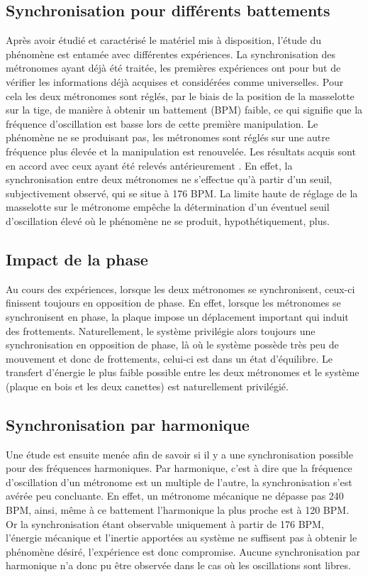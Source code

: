 \documentclass[a4paper,11pt]{report}
\begin{document}
\subsection{Synchronisation pour différents battements}
Après avoir étudié et caractérisé le matériel mis à disposition, l'étude du phénomène est entamée avec différentes expériences. La synchronisation des métronomes ayant déjà été traitée, les premières expériences ont pour but de vérifier les informations déjà acquises et considérées comme universelles. Pour cela les deux métronomes sont réglés, par le biais de la position de la masselotte sur la tige, de manière à obtenir un battement (BPM) faible, ce qui signifie que la fréquence d'oscillation est basse lors de cette première manipulation. Le phénomène ne se produisant pas, les métronomes sont réglés sur une autre fréquence plus élevée et la manipulation est renouvelée. Les résultats acquis sont en accord avec ceux ayant été relevés antérieurement \cite{ram}. En effet, la synchronisation entre deux métronomes ne s'effectue qu'à partir d'un seuil, subjectivement observé, qui se situe à 176 BPM. La limite haute de réglage de la masselotte sur le métronome empêche la détermination d'un éventuel seuil d'oscillation élevé où le phénomène ne se produit, hypothétiquement, plus.

\subsection{Impact de la phase}
Au cours des expériences, lorsque les deux métronomes se synchronisent, ceux-ci finissent toujours en opposition de phase. En effet, lorsque les métronomes se synchronisent en phase, la plaque impose un déplacement important qui induit des frottements. Naturellement, le système privilégie alors toujours une synchronisation en opposition de phase, là où le système possède très peu de mouvement et donc de frottements, celui-ci est dans un état d'équilibre. Le transfert d'énergie le plus faible possible entre les deux métronomes et le système (plaque en bois et les deux canettes) est naturellement privilégié.	

\subsection{Synchronisation par harmonique}
Une étude est ensuite menée afin de savoir si il y a une synchronisation possible pour des fréquences harmoniques. Par harmonique, c'est à dire que la fréquence d'oscillation d'un métronome est un multiple de l'autre, la synchronisation s'est avérée peu concluante. En effet, un métronome mécanique ne dépasse pas 240 BPM, ainsi, même à ce battement l'harmonique la plus proche est à 120 BPM. Or la synchronisation étant observable uniquement à partir de 176 BPM, l'énergie mécanique et l'inertie apportées au système ne suffisent pas à obtenir le phénomène désiré, l'expérience est donc compromise. Aucune synchronisation par harmonique n'a donc pu être observée dans le cas où les oscillations sont libres.
\end{document}
